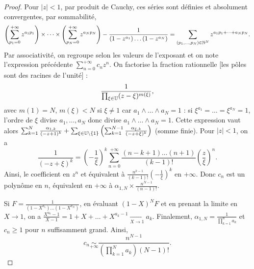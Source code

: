 \documentclass[12pt]{article}
\begin{document}
\begin{proof}
    Pour $\left\lvert z\right\rvert<1$, par produit de Cauchy, ces séries sont définies et absolument convergentes, par sommabilité,
    \begin{equation}
        \left(\sum_{p_1=0}^{+\infty}z^{a_1 p_1}\right)\times\dots\times\left(\sum_{p_N=0}^{+\infty}z^{a_Np_N}\right)-\frac{1}{(1-z^{a_1})\dots(1-z^{a_N})}=\sum_{(p_1,\dots,p_N)\in\mathbb{N}^{N}}z^{a_1p_1+\dots+a_Np_N}.
    \end{equation}
    Par associativité, on regroupe selon les valeurs de l'exposant et on note l'expression précédente $\sum_{n=0}^{+\infty}c_nz^{n}$. On factorise la fraction rationnelle [les pôles sont des racines de l'unité] :
    \begin{equation}
        \frac{1}{\prod_{\xi\in\mathbb{U}}(z-\xi)^{m\left(\xi\right)}},
    \end{equation}
    avec $m(1)=N$, $m\left(\xi\right)<N$ si $\xi\neq1$ car $a_1\wedge\dots\wedge a_N=1$ : si $\xi^{a_1}=\dots=\xi^{a_N}=1$, l'ordre de $\xi$ divise $a_1,\dots,a_N$ donc divise $a_1\wedge\dots\wedge a_N=1$. Cette expression vaut alors 
    $\sum_{k=1}^{N}\frac{\alpha_{1,k}}{(-z+1)^{k}}+\sum_{\xi\in\mathbb{U}\setminus\left\lbrace1\right\rbrace}\left(\sum_{k=1}^{N-1}\frac{\alpha_{\xi,k}}{(-z+\xi)^{k}}\right)$ (somme finie). Pour $\left\lvert z\right\rvert<1$, on a 
    \begin{equation}
        \frac{1}{\left(-z+\xi\right)^{k}}=\left(-\frac{1}{\xi}\right)^{k}\sum_{n=0}^{+\infty}\frac{(n-k+1)\dots(n+1)}{(k-1)!}\left(\frac{z}{\xi}\right)^{n}.
    \end{equation}
    Ainsi, le coefficient en $z^{n}$ et équivalent à $\frac{n^{k-1}}{(k-1)!}\left(-\frac{1}{\xi}\right)^{k}$ en $+\infty$. Donc $c_n$ est un polynôme en $n$, équivalent en $+\infty$ à $\alpha_{1,N}\times \frac{n^{N-1}}{(n-1)!}$.

    Si $F=\frac{1}{(1-X^{a_1})\dots (1-X^{a_N})}$, en évaluant $(1-X)^{N}F$ et en prenant la limite en $X\to 1$, on a $\frac{X^{a_k}-1}{X-1}=1+X+\dots+X^{a_k-1}\xrightarrow[X\to1]{}a_k$. Finalement, $\alpha_{1,N}=\frac{1}{\prod_{k=1}^{n}a_k}$ et $c_n\geqslant1$ pour $n$ suffisamment grand. Ainsi,
    \begin{equation}
        \boxed{
            c_n\underset{+\infty}{\sim}\frac{n^{N-1}}{\left(\prod_{k=1}^{N}a_k\right)(N-1)!}.
        }
    \end{equation}
\end{proof}
\end{document}
